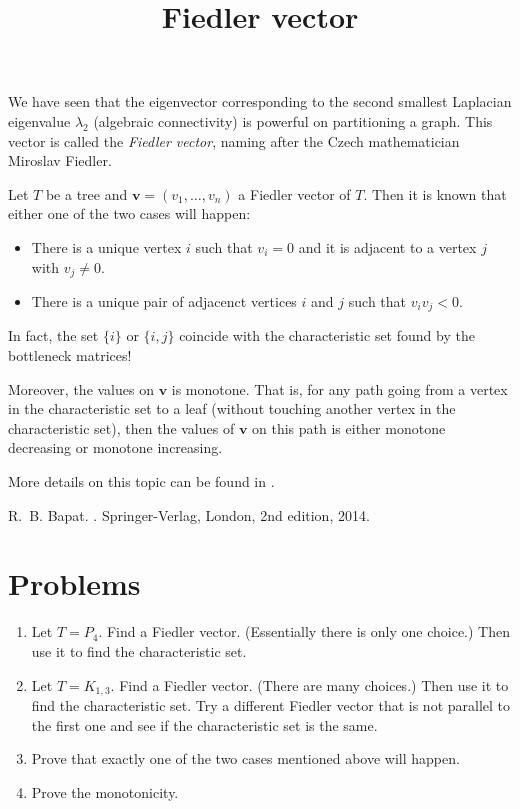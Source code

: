 \documentclass{article}
\title{Fiedler vector}
\date{\vspace{-1cm}}
\newcommand{\bv}{\mathbf{v}}
\theoremstyle{definition}
\begin{document}
\maketitle
\large

We have seen that the eigenvector corresponding to the second smallest Laplacian eigenvalue $\lambda_2$ (algebraic connectivity) is powerful on partitioning a graph.  This vector is called the \emph{Fiedler vector}, naming after the Czech mathematician Miroslav Fiedler.  

Let $T$ be a tree and $\bv = (v_1,\ldots,v_n)$ a Fiedler vector of $T$.  Then it is known that either one of the two cases will happen:
\begin{itemize}
\item There is a unique vertex $i$ such that $v_i = 0$ and it is adjacent to a vertex $j$ with $v_j \neq 0$.  
\item There is a unique pair of adjacenct vertices $i$ and $j$ such that $v_iv_j<0$.  
\end{itemize}
In fact, the set $\{i\}$ or $\{i,j\}$ coincide with the characteristic set found by the bottleneck matrices!

Moreover, the values on $\bv$ is monotone.  That is, for any path going from a vertex in the characteristic set to a leaf (without touching another vertex in the characteristic set), then the values of $\bv$ on this path is either monotone decreasing or monotone increasing.

More details on this topic can be found in \cite{BapatGM14}.

\begin{thebibliography}{9}
R.~B. Bapat.
.
\newblock Springer-Verlag, London, 2nd edition, 2014.
\end{thebibliography}


\section*{Problems}
\begin{enumerate}
\setlength\itemsep{2em}
\item Let $T = P_4$.  Find a Fiedler vector.  (Essentially there is only one choice.)  Then use it to find the characteristic set.
\item Let $T = K_{1,3}$.  Find a Fiedler vector.  (There are many choices.)  Then use it to find the characteristic set.  Try a different Fiedler vector that is not parallel to the first one and see if the characteristic set is the same.
\item Prove that exactly one of the two cases mentioned above will happen.
\item Prove the monotonicity.  
\end{enumerate}

\end{document}
